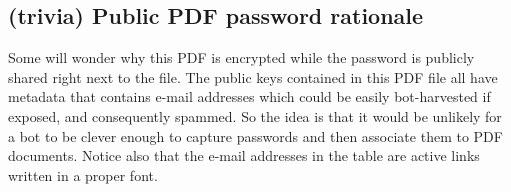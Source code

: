 \documentclass[12pt]{scrartcl}
\begin{document}
\begin{preview}
\section{(trivia) Public PDF password rationale}
\begin{multicols}{2}
  Some will wonder why this PDF is encrypted while the password is
  publicly shared right next to the file.  The public keys contained
  in this PDF file all have metadata that contains e-mail addresses
  which could be easily bot-harvested if exposed, and consequently
  spammed.  So the idea is that it would be unlikely for a bot to be
  clever enough to capture passwords and then associate them to PDF
  documents.  Notice also that the e-mail addresses in the table are
  active links written in a proper font.
\end{multicols}

\end{preview}
\end{document}
